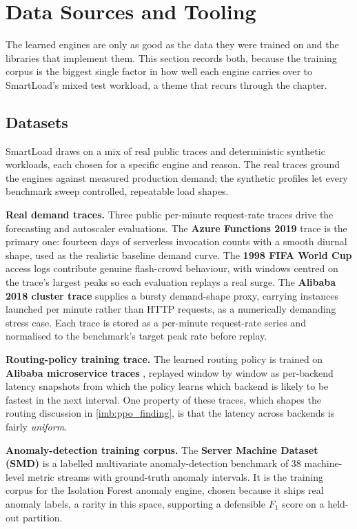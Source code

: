 \section{Data Sources and Tooling}\label{imb:data_tooling}

The learned engines are only as good as the data they were trained on and the
libraries that implement them. This section records both, because the training
corpus is the biggest single factor in how well each engine carries over to
SmartLoad's mixed test workload, a theme that recurs through the chapter.

\subsection{Datasets}\label{imb:datasets}

SmartLoad draws on a mix of real public traces and deterministic synthetic
workloads, each chosen for a specific engine and reason. The real traces ground
the engines against measured production demand; the synthetic profiles let every
benchmark sweep controlled, repeatable load shapes.

\textbf{Real demand traces.} Three public per-minute request-rate traces drive
the forecasting and autoscaler evaluations. The \textbf{Azure Functions 2019}
trace \cite{shahrad2020serverless} is the primary one: fourteen days of
serverless invocation counts with a smooth diurnal shape, used as the realistic
baseline demand curve. The \textbf{1998 FIFA World Cup} access logs
\cite{arlitt2000worldcup} contribute genuine flash-crowd behaviour, with windows
centred on the trace's largest peaks so each evaluation replays a real surge. The
\textbf{Alibaba 2018 cluster trace} \cite{guo2019alibaba} supplies a bursty
demand-shape proxy, carrying instances launched per minute rather than HTTP
requests, as a numerically demanding stress case. Each trace is stored as a
per-minute request-rate series and normalised to the benchmark's target peak rate
before replay.

\textbf{Routing-policy training trace.} The learned routing policy is trained on
\textbf{Alibaba microservice traces} \cite{guo2019alibaba}, replayed window by
window as per-backend latency snapshots from which the policy learns which backend
is likely to be fastest in the next interval. One property of these traces, which
shapes the routing discussion in \cref{imb:ppo_finding}, is that the latency
across backends is fairly \emph{uniform}.

\textbf{Anomaly-detection training corpus.} The \textbf{Server Machine Dataset
(SMD)} \cite{su2019omnianomaly} is a labelled multivariate anomaly-detection
benchmark of 38 machine-level metric streams with ground-truth anomaly intervals.
It is the training corpus for the Isolation Forest anomaly engine, chosen because
it ships real anomaly labels, a rarity in this space, supporting a defensible
$F_1$ score on a held-out partition.

